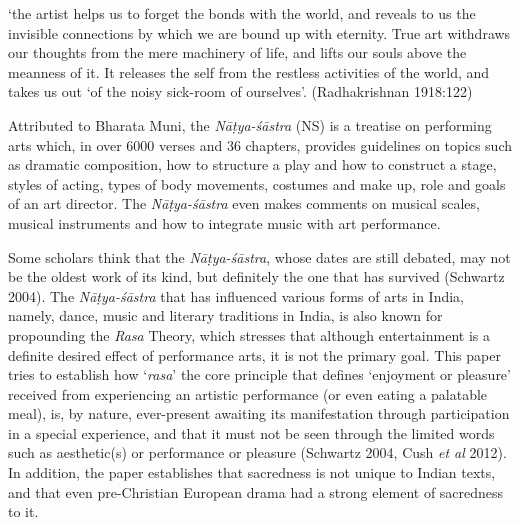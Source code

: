 \begin{myquote}
‘the artist helps us to forget the bonds with the world, and reveals to us the invisible connections by which we are bound up with eternity. True art withdraws our thoughts from the mere machinery of life, and lifts our souls above the meanness of it. It releases the self from the restless activities of the world, and takes us out ‘of the noisy sick-room of ourselves’.
\hfill (Radhakrishnan 1918:122)
\end{myquote}

Attributed to Bharata Muni, the \textsl{Nāṭya-śāstra} (NS) is a treatise on performing arts which, in over 6000 verses and 36 chapters, provides guidelines on topics such as dramatic composition, how to structure a play and how to construct a stage, styles of acting, types of body movements, costumes and make up, role and goals of an art director. The \textsl{Nāṭya-śāstra} even makes comments on musical scales, musical instruments and how to integrate music with art performance.

\newpage

Some scholars think that the \textsl{Nāṭya-śāstra}, whose dates are still debated, may not be the oldest work of its kind, but definitely the one that has survived (Schwartz 2004). The \textsl{Nāṭya-śāstra} that has influenced various forms of arts in India, namely, dance, music and literary traditions in India, is also known for propounding the \textsl{Rasa} Theory, which stresses that although entertainment is a definite desired effect of performance arts, it is not the primary goal. This paper tries to establish how ‘\textsl{rasa}' the core principle that defines ‘enjoyment or pleasure’ received from experiencing an artistic performance (or even eating a palatable meal), is, by nature, ever-present awaiting its manifestation through participation in a special experience, and that it must not be seen through the limited words such as aesthetic(s) or performance or pleasure (Schwartz 2004, Cush \textsl{et al} 2012). In addition, the paper establishes that sacredness is not unique to Indian texts, and that even pre-Christian European drama had a strong element of sacredness to it.

